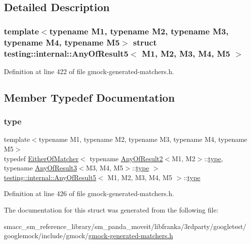 \subsection{Detailed Description}
\subsubsection*{template$<$typename M1, typename M2, typename M3, typename M4, typename M5$>$\newline
struct testing\+::internal\+::\+Any\+Of\+Result5$<$ M1, M2, M3, M4, M5 $>$}



Definition at line 422 of file gmock-\/generated-\/matchers.\+h.



\subsection{Member Typedef Documentation}
\mbox{\label{structtesting_1_1internal_1_1AnyOfResult5_a459a06dc5791313dce942668714f0c99}} 
\subsubsection{\texorpdfstring{type}{type}}
{\footnotesize\ttfamily template$<$typename M1, typename M2, typename M3, typename M4, typename M5$>$ \\
typedef \hyperlink{classtesting_1_1internal_1_1EitherOfMatcher}{Either\+Of\+Matcher}$<$ typename \hyperlink{structtesting_1_1internal_1_1AnyOfResult2}{Any\+Of\+Result2}$<$M1, M2$>$\+::\hyperlink{structtesting_1_1internal_1_1AnyOfResult5_a459a06dc5791313dce942668714f0c99}{type}, typename \hyperlink{structtesting_1_1internal_1_1AnyOfResult3}{Any\+Of\+Result3}$<$M3, M4, M5$>$\+::\hyperlink{structtesting_1_1internal_1_1AnyOfResult5_a459a06dc5791313dce942668714f0c99}{type} $>$ \hyperlink{structtesting_1_1internal_1_1AnyOfResult5}{testing\+::internal\+::\+Any\+Of\+Result5}$<$ M1, M2, M3, M4, M5 $>$\+::\hyperlink{structtesting_1_1internal_1_1AnyOfResult5_a459a06dc5791313dce942668714f0c99}{type}}



Definition at line 426 of file gmock-\/generated-\/matchers.\+h.



The documentation for this struct was generated from the following file\+:\begin{DoxyCompactItemize}
\item 
smacc\+\_\+sm\+\_\+reference\+\_\+library/sm\+\_\+panda\+\_\+moveit/libfranka/3rdparty/googletest/googlemock/include/gmock/\hyperlink{gmock-generated-matchers_8h}{gmock-\/generated-\/matchers.\+h}\end{DoxyCompactItemize}
